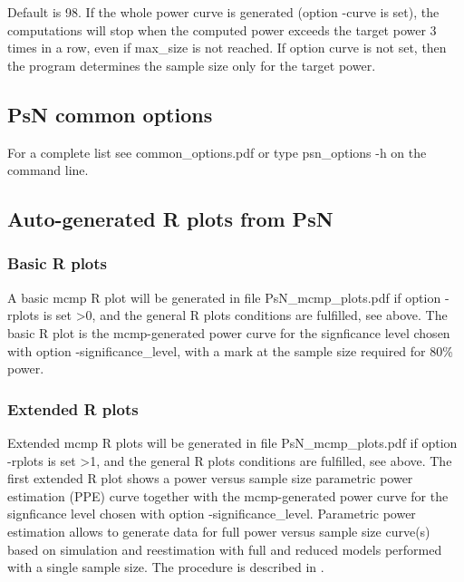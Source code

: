 \begin{optionlist}
\nextopt
{}
Default is 98. If the whole power curve is generated (option -curve is set), the computations will stop when the computed power exceeds the target power 3 times in a row, even if max\_size is not reached. If option curve is not set, then the program determines the sample size only for the target power. 
\nextopt
\end{optionlist}

\subsection{PsN common options}
For a complete list see common\_options.pdf or type psn\_options -h on the command line.

\subsection{Auto-generated R plots from PsN}
\newcommand{\rplotsconditions}{The default mcmp template requires the R library ggplot2.
If the packages are not installed no pdf will be generated, see the .Rout file in the main run directory for error messages.}


\subsubsection*{Basic R plots}
A basic mcmp R plot will be generated in file PsN\_mcmp\_plots.pdf if option -rplots is set >0, and the general R plots conditions are fulfilled, see above.
The basic R plot is the mcmp-generated power curve for the signficance level chosen with option -significance\_level, with a mark at the sample size required for 80\% power.
\subsubsection*{Extended R plots}
Extended mcmp R plots will be generated in file PsN\_mcmp\_plots.pdf if option -rplots is set >1, and the general R plots conditions are fulfilled, see above.
The first extended R plot shows a power versus sample size parametric power estimation (PPE) curve together with the mcmp-generated power curve for the signficance level chosen with option -significance\_level. Parametric power estimation allows to generate data for full power versus sample size curve(s) based on simulation and reestimation with full and reduced models performed with a single sample size.
The procedure is described in \cite{Ueckert}. 

